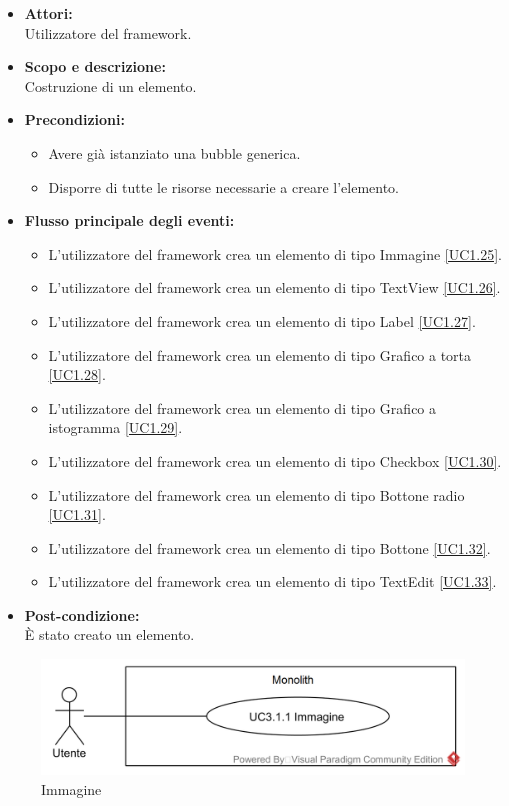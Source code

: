 \begin{itemize}
	\item \textbf{Attori:}
	\\Utilizzatore del framework.
	\item \textbf{Scopo e descrizione:} 
	\\Costruzione di un elemento.
	\item \textbf{Precondizioni:}
	\begin{itemize}
		\item Avere già istanziato una bubble generica.
		\item Disporre di tutte le risorse necessarie a creare l'elemento.
	\end{itemize}
	\item \textbf{Flusso principale degli eventi:}
	\begin{itemize}
		\item L'utilizzatore del framework crea un elemento di tipo Immagine \ref{UC1.25}.
		\item L'utilizzatore del framework crea un elemento di tipo TextView \ref{UC1.26}.
		\item L'utilizzatore del framework crea un elemento di tipo Label \ref{UC1.27}.
		\item L'utilizzatore del framework crea un elemento di tipo Grafico a torta \ref{UC1.28}.
		\item L'utilizzatore del framework crea un elemento di tipo Grafico a istogramma \ref{UC1.29}.
		\item L'utilizzatore del framework crea un elemento di tipo Checkbox \ref{UC1.30}.
		\item L'utilizzatore del framework crea un elemento di tipo Bottone radio \ref{UC1.31}.
		\item L'utilizzatore del framework crea un elemento di tipo Bottone \ref{UC1.32}.
		\item L'utilizzatore del framework crea un elemento di tipo TextEdit \ref{UC1.33}. 
	\end{itemize}
	\item \textbf{Post-condizione:}
	\\È stato creato un elemento.
\end{itemize}

\begin{samepage}
\nopagebreak
\begin{figure}[H]
	\centering
	\includegraphics[width=15cm]{../../documenti/AnalisiDeiRequisiti/Diagrammi_img/usecase/uc1_25.png}
	\caption{\UCFFCaption{} Immagine}
\end{figure}
\end{samepage}


